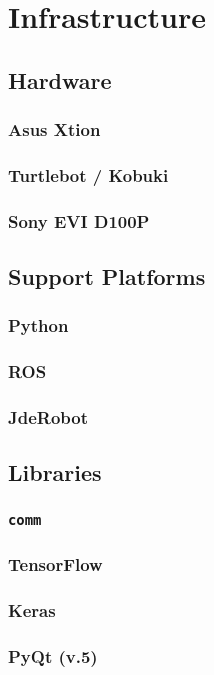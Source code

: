 \chapter{Infrastructure}

	\section{Hardware}
		\subsection{Asus Xtion}
		\subsection{Turtlebot / Kobuki}
		\subsection{Sony EVI D100P}
	\section{Support Platforms}
		\subsection{Python}
		\subsection{ROS}
		\subsection{JdeRobot}
	\section{Libraries}
		\subsection{\texttt{comm}}
		\subsection{TensorFlow}
		\subsection{Keras}
		\subsection{PyQt (v.5)}

